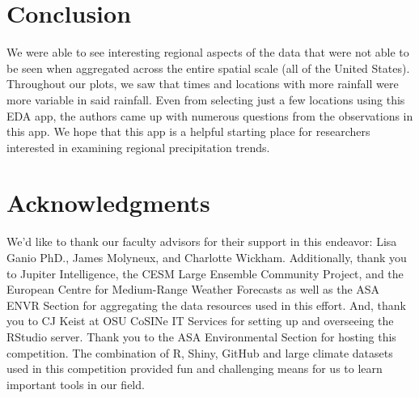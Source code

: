 \documentclass[10pt,letterpaper]{article}
\begin{document}
\section*{Conclusion}

We were able to see interesting regional aspects of the data that were not able to be seen when aggregated across the entire spatial scale (all of the United States). Throughout our plots, we saw that times and locations with more rainfall were more variable in said rainfall. Even from selecting just a few locations using this EDA app, the authors came up with numerous questions from the observations in this app. We hope that this app is a helpful starting place for researchers interested in examining regional precipitation trends.





\section*{Acknowledgments}

We'd like to thank our faculty advisors for their support in this endeavor: Lisa Ganio PhD., James Molyneux, and Charlotte Wickham. Additionally, thank you to Jupiter Intelligence, the CESM Large Ensemble Community Project, and the European Centre for Medium-Range Weather Forecasts as well as the ASA ENVR Section for aggregating the data resources used in this effort. And, thank you to CJ Keist at OSU CoSINe IT Services for setting up and overseeing the RStudio server.
Thank you to the ASA Environmental Section for hosting this competition. The combination of R, Shiny, GitHub and large climate datasets used in this competition provided fun and challenging means for us to learn important tools in our field.




\nolinenumbers

%
%
%

\end{document}
